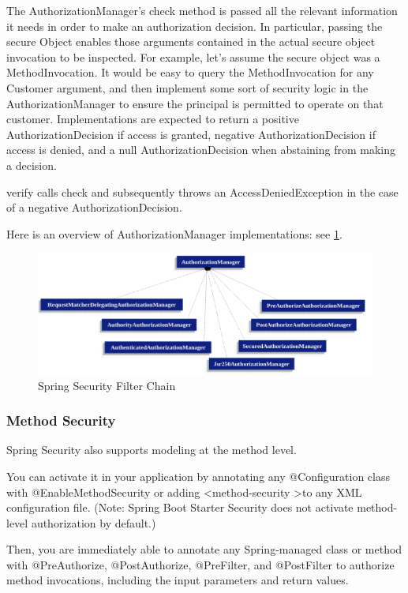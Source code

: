 \documentclass{scrartcl}
\begin{document}
The AuthorizationManager's check method is passed all the relevant information it needs in order to make an authorization decision. In particular, passing the secure Object enables those arguments contained in the actual secure object invocation to be inspected. For example, let’s assume the secure object was a MethodInvocation. It would be easy to query the MethodInvocation for any Customer argument, and then implement some sort of security logic in the AuthorizationManager to ensure the principal is permitted to operate on that customer. Implementations are expected to return a positive AuthorizationDecision if access is granted, negative AuthorizationDecision if access is denied, and a null AuthorizationDecision when abstaining from making a decision.

verify calls check and subsequently throws an AccessDeniedException in the case of a negative AuthorizationDecision.

Here is an overview of AuthorizationManager implementations: see \ref{fig:auth-manag-impl}.

\begin{figure}
    \centering
    \includegraphics[width=1\linewidth]{auth-manag-impl}
    \caption{Spring Security Filter Chain}
    \label{fig:auth-manag-impl}
\end{figure}

\subsubsection{Method Security}

Spring Security also supports modeling at the method level.

You can activate it in your application by annotating any @Configuration class with @EnableMethodSecurity or adding \textless method-security \textgreater  to any XML configuration file. (Note: Spring Boot Starter Security does not activate method-level authorization by default.)

Then, you are immediately able to annotate any Spring-managed class or method with @PreAuthorize, @PostAuthorize, @PreFilter, and @PostFilter to authorize method invocations, including the input parameters and return values.
\end{document}
